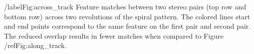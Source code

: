/label{Fig:across_track} Feature matches between two stereo pairs (top row and bottom row) across two revolutions of the spiral pattern. The colored lines start and end points correspond to the same feature on the first pair and second pair. The reduced overlap results in fewer matches when compared to Figure /ref{Fig:along_track}.
  
  